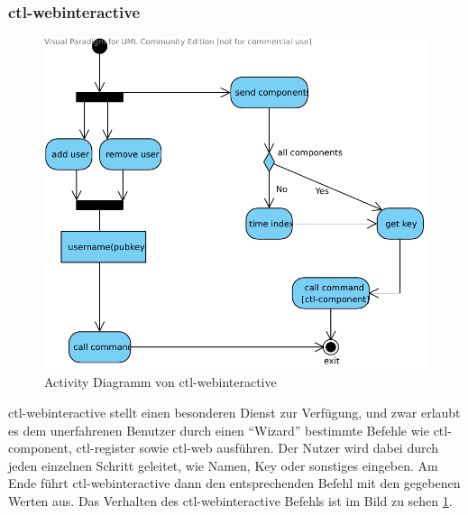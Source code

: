 \subsubsection{ctl-webinteractive}
\begin{figure}[H]
  \begin{center}
	\includegraphics[scale=0.6]{bilder/activitydiagrambackend.pdf}
	\caption{Activity Diagramm von ctl-webinteractive}
	\label{g ctl-webinteractive}
  \end{center}
\end{figure}
ctl-webinteractive stellt einen besonderen Dienst zur Verfügung, und zwar
erlaubt es dem unerfahrenen Benutzer durch einen "`Wizard"' bestimmte Befehle
wie ctl-component, ctl-register sowie ctl-web ausführen. Der Nutzer wird dabei
durch jeden einzelnen Schritt geleitet, wie Namen, Key oder sonstiges eingeben.
Am Ende führt ctl-webinteractive dann den entsprechenden Befehl mit den
gegebenen Werten aus. Das Verhalten des ctl-webinteractive Befehls ist 
im Bild zu sehen \ref{g ctl-webinteractive}.
